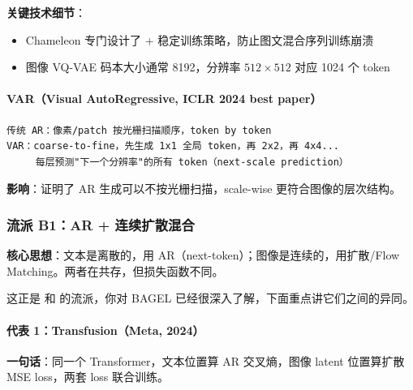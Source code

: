 \begin{conceptbox}
\textbf{关键技术细节}：
\begin{itemize}
  \item Chameleon 专门设计了  + 稳定训练策略，防止图文混合序列训练崩溃
  \item 图像 VQ-VAE 码本大小通常 8192，分辨率 $512\times512$ 对应 1024 个 token
\end{itemize}
\end{conceptbox}

\paragraph{VAR（Visual AutoRegressive, ICLR 2024 best paper）}


\begin{lstlisting}
传统 AR：像素/patch 按光栅扫描顺序，token by token
VAR：coarse-to-fine，先生成 1x1 全局 token，再 2x2，再 4x4...
     每层预测"下一个分辨率"的所有 token（next-scale prediction）
\end{lstlisting}

\begin{summarybox}
\textbf{影响}：证明了 AR 生成可以不按光栅扫描，scale-wise 更符合图像的层次结构。
\end{summarybox}

\subsubsection{流派 B1：AR + 连续扩散混合}

\begin{conceptbox}
\textbf{核心思想}：文本是离散的，用 AR（next-token）；图像是连续的，用扩散/Flow Matching。两者在共存，但损失函数不同。
\end{conceptbox}

\begin{intubox}
这正是  和  的流派，你对 BAGEL 已经很深入了解，下面重点讲它们之间的异同。
\end{intubox}

\paragraph{代表 1：Transfusion（Meta, 2024）}

\textbf{一句话}：同一个 Transformer，文本位置算 AR 交叉熵，图像 latent 位置算扩散 MSE loss，两套 loss 联合训练。

